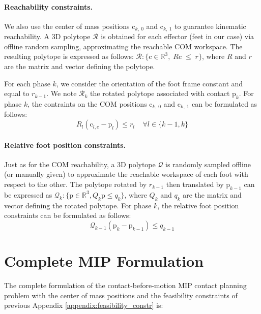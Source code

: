 \paragraph{Reachability constraints.}
We also use the center of mass positions $\mbox{c}_{k,\:0}$ and $\mbox{c}_{k,\:1}$ to guarantee kinematic reachability.
A 3D polytope $\mathcal{R}$ is obtained for each effector (feet in our case) via offline random sampling, approximating the reachable COM workspace.
The resulting polytope is expressed as follows: $\mathcal{R} : \{\mbox{c} \in \mathbb{R}^3 , \; \! R \mbox{c} \; \leq \; \! r\}$, where $R$ and $r$ are the matrix and vector defining the polytope.

For each phase $k$, we consider the orientation of the foot frame constant and equal to $r_{k-1}$.
We note $\mathcal{R}_k$ the rotated polytope associated with contact $\mbox{p}_{k}$.
For phase $k$, the contraints on the COM positions $\mbox{c}_{k,\:0}$ and $\mbox{c}_{k,\:1}$ can be formulated as follows:
\begin{equation}
    R_{l} (\mbox{c}_{l,e} - \mbox{p}_{l}) \leq r_l \;\;\;\; \forall l \in \{k-1,k\}
\end{equation}

\paragraph{Relative foot position constraints.\label{appendix:foot_pos_constr}}
Just as for the COM reachability, a 3D polytope $\mathcal{Q}$ is randomly sampled offline (or manually given) to approximate the reachable workspace of each foot with respect to the other. The polytope rotated by $r_{k-1}$ then translated by $\mbox{p}_{k-1}$ can be expressed as $\mathcal{Q}_k: \{ \mbox{p} \in \mathbb{R}^3, Q_k \mbox{p} \leq q_k \}$, where $Q_k$ and $q_k$ are the matrix and vector defining the rotated polytope.
For phase $k$, the relative foot position constraints can be formulated as follows:
\begin{equation}
    \mathcal{Q}_{k-1} (\mbox{p}_k - \mbox{p}_{k-1}) \leq q_{k-1}
\end{equation}

\section{Complete MIP Formulation \label{appendix:complete_mip_formulation}}
The complete formulation of the contact-before-motion MIP contact planning problem with the center of mass positions and the feasibility constraints of previous Appendix \ref{appendix:feasibility_constr} is:

